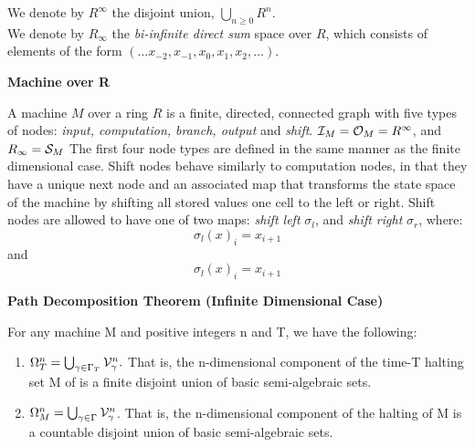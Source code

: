   We denote by $R^\infty$ the disjoint union, $\bigcup_{n \geq 0} R^n$.\\

  We denote by $R_\infty$ the \emph{bi-infinite direct sum} space over
  $R$, which consists of elements of the form $(\ldots x_{-2}, x_{-1}, x_0,
  x_1, x_2, \ldots)$.
  
  \begin{definition}{\textbf{Machine over R}}

    A machine $M$ over a ring $R$ is a finite, directed, connected
    graph with five types of nodes: \emph{input, computation, branch,
      output} and \emph{shift}.  $\mathcal{I}_M = \mathcal{O}_M =
    R^\infty$, and $R_\infty = \mathcal{S}_M$ The first four node
    types are defined in the same manner as the finite dimensional
    case.  Shift nodes behave similarly to computation nodes, in that
    they have a unique next node and an associated map that transforms
    the state space of the machine by shifting all stored values one
    cell to the left or right. Shift nodes are allowed to have one of
    two maps: \emph{shift left} $\sigma_l$, and \emph{shift
      right} $\sigma_r$, where:\\

    $$\sigma_l(x)_i = x_{i+1}$$ and $$\sigma_l(x)_i = x_{i+1}$$
  \end{definition}
  
  \begin{theorem}{\textbf{Path Decomposition Theorem (Infinite Dimensional Case)}}
    
    For any machine M and positive integers n and T, we have the
    following:

    \begin{enumerate}
    \item $\Omega_T^n = \bigcup_{\gamma \in \Gamma_{T}}
      \mathcal{V}_{\gamma}^n.$ That is, the n-dimensional
      component of the time-T halting set M of is a finite disjoint union
      of basic semi-algebraic sets.
    \item $\Omega_M^n = \bigcup_{\gamma \in \Gamma_{}}
      \mathcal{V}_{\gamma}^n$.  That is, the n-dimensional
      component of the halting of M is a countable disjoint union of
      basic semi-algebraic sets.
      \end{enumerate}
  \end{theorem}

